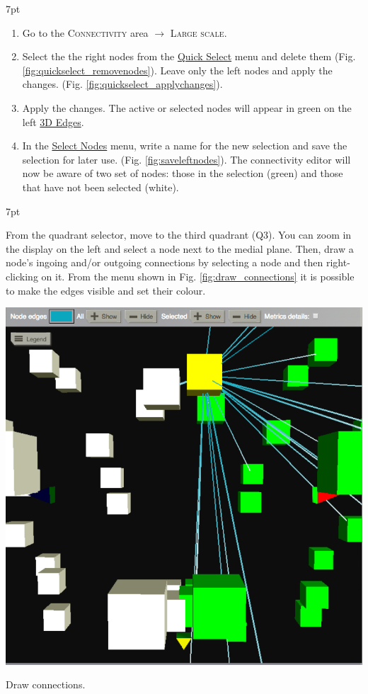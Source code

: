 \documentclass{tufte-handout}
\newenvironment{formal}{%
  \def\FrameCommand{%
    \hspace{1pt}%
    {\color{DarkBlue}\vrule width 2pt}%
    {\color{formalshade}\vrule width 4pt}%
    \colorbox{formalshade}%
  }%
  \MakeFramed{\advance\hsize-\width\FrameRestore}%
  \noindent\hspace{-4.55pt}%
  \begin{adjustwidth}{}{7pt}%
  \vspace{2pt}\vspace{2pt}%
}
{%
  \vspace{2pt}\end{adjustwidth}\endMakeFramed%
}
\newenvironment{blah}{%
  \def\FrameCommand{%
    \hspace{1pt}%
    {\color{DarkOrange}\vrule width 2pt}%
    {\color{PeachPuff}\vrule width 4pt}%
    \colorbox{PeachPuff}%
  }%
  \MakeFramed{\advance\hsize-\width\FrameRestore}%
  \noindent\hspace{-4.55pt}%
  \begin{adjustwidth}{}{7pt}%
  \vspace{2pt}\vspace{2pt}%
}
{%
  \vspace{2pt}\end{adjustwidth}\endMakeFramed%
}
\begin{document}
\begin{formal}
  \begin{enumerate}
  \item Go to the \textsc{Connectivity} area $\rightarrow$ \textsc{Large scale}.
  \item Select the the right nodes from the \underline{Quick Select} menu and delete them (Fig. \ref{fig:quickselect_removenodes}). Leave only the left nodes and apply the changes. (Fig. \ref{fig:quickselect_applychanges}). 
  \item Apply the changes. The active or selected nodes will appear in green on the left \underline{3D Edges}. 
  \item In the \underline{Select Nodes} menu, write a name for the new selection and save the selection for later use. (Fig. \ref{fig:saveleftnodes}). The connectivity editor will now be aware of two set of nodes: those in the selection (green) and those that have not been selected (white).
  \end{enumerate}
\end{formal}

\newpage


\begin{blah}
From the quadrant selector, move to the third quadrant (Q3). You can zoom in the display on the left and select a node next to the medial plane. Then, draw a node's ingoing and/or outgoing connections by selecting a node and then right-clicking on it. From the menu shown in Fig. \ref{fig:draw_connections} it is possible to make the edges visible and set their colour. 
\end{blah}
\begin{marginfigure}%
  \includegraphics[width=\linewidth]{Handout_UI_ModellingStructuralLesions_DrawConnections}%
  \caption{Draw connections.}%
  \label{fig:draw_connections}%
\end{marginfigure}%
\end{document}
